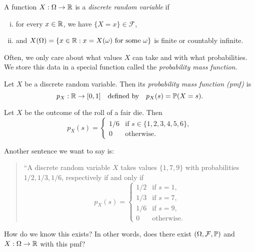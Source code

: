 \begin{definition}
  A function $X : \Omega \to \mathbb{R}$ is a
  \emph{discrete random variable} if
  \begin{enumerate}[(i)]
    \item for every $x \in \mathbb{R}$, we have
      $\{X = x\} \in \mathcal{F}$,
    \item and $X(\Omega) = \{x \in \mathbb{R} : x = X(\omega) \text{ for some } \omega\}$
      is finite or countably infinite.
  \end{enumerate}
\end{definition}

\begin{remark}
  Often, we only care about what values $X$
  can take and with what probabilities. We store this
  data in a special function called the
  \emph{probability mass function}.
\end{remark}

\begin{definition}
  Let $X$ be a discrete random variable. Then
  its \emph{probability mass function (pmf)} is
  \[
    p_X : \mathbb{R} \to [0, 1] \quad \text{defined by} \quad p_X(s) = \mathbb{P}(X = s).
  \]
\end{definition}

\begin{example}
  Let $X$ be the outcome of the roll of a fair die.
  Then
  \[
    p_X(s) = \begin{cases}
      1/6 & \text{if } s \in \{1, 2, 3, 4, 5, 6\}, \\
      0 & \text{otherwise}.
    \end{cases}
  \]
\end{example}

\begin{remark}
  Another sentence we want to say is:
  \begin{quote}
    ``A discrete random variable $X$ takes
    values $\{1, 7, 9\}$ with probabilities
    $1 / 2, 1 / 3, 1 / 6$, respectively if and only
    if
    \[
      p_X(s) =
      \begin{cases}
        1 / 2 & \text{if } s = 1, \\
        1 / 3 & \text{if } s = 7, \\
        1 / 6 & \text{if } s = 9, \\
        0 & \text{otherwise}.
      \end{cases}
    \]
  \end{quote}
  How do we know this exists? In other words,
  does there exist
  $(\Omega, \mathcal{F}, \mathbb{P})$ and
  $X : \Omega \to \mathbb{R}$ with this pmf?
\end{remark}

